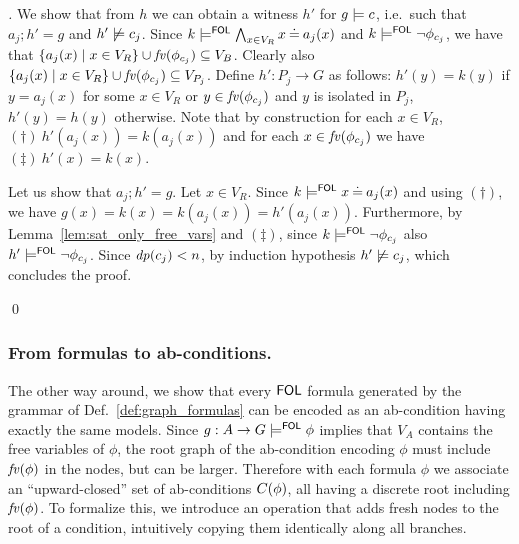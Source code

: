 \begin{proof}[]


We show that from $h$ we can obtain a witness $h'$  for $g \models c$, i.e.~such that $a_j;h' = g$ and $h' \not \models c_j$.
%
Since $k \models^{\mathsf{FOL}} \bigwedge_{x \in V_{R}} x \mathbin{\doteq} a_j(x)$ and $k \models^{\mathsf{FOL}} \neg \phi_{c_j}$, 
we have that $\{a_j(x) \mid x \in V_R\} \cup \mathit{fv}(\phi_{c_j}) \subseteq V_B$. Clearly also $\{a_j(x) \mid x \in V_R\} \cup \mathit{fv}(\phi_{c_j}) \subseteq V_{P_j}$. Define $h': P_j \to G$ as follows: $h'(y) = k(y)$ if $y = a_j(x)$ for some $x \in V_R$ or $y \in \mathit{fv}(\phi_{c_j})$ and $y$ is isolated in $P_j$, $h'(y) = h(y)$ otherwise. Note that by construction for each $x \in V_R$, $(\dagger)\ h'(a_j(x)) = k(a_j(x))$ and for each $x \in \mathit{fv}(\phi_{c_j})$ we have $(\ddagger)\ h'(x) = k(x)$. 

Let us show that $a_j;h' = g$. Let $x \in V_R$. Since $k \models^{\mathsf{FOL}} x \mathbin{\doteq} a_j(x)$ and using $(\dagger)$, we have $g(x) = k(x) = k(a_j(x)) = h'(a_j(x))$. Furthermore, by Lemma~\ref{lem:sat_only_free_vars} and $(\ddagger)$, since $k\models^{\mathsf{FOL}} \neg \phi_{c_j}$  also $h'\models^{\mathsf{FOL}} \neg \phi_{c_j}$. Since $\mathit{dp}(c_j) < n$, by induction hypothesis $h' \not \models c_j$, which concludes the proof.

\qed
\end{proof}

\subsubsection{From formulas to ab-conditions.} The other way around, we show that every $\mathsf{FOL}$ formula generated by the grammar of Def.~\ref{def:graph_formulas} can be encoded as an ab-condition having exactly the same models. Since $g:A \rightarrow G \models^{\mathsf{FOL}} \phi$ implies that $V_A$ contains the free variables of $\phi$, the root graph of the ab-condition encoding $\phi$ must include $\mathit{fv}(\phi)$ in the nodes, but can be larger. Therefore with each formula $\phi$ we associate an ``upward-closed'' set of ab-conditions $C({\phi})$, all having a discrete root including $\mathit{fv}(\phi)$. 
To formalize this, we introduce an operation that adds fresh nodes to the root of a condition, intuitively copying them identically along all branches.

